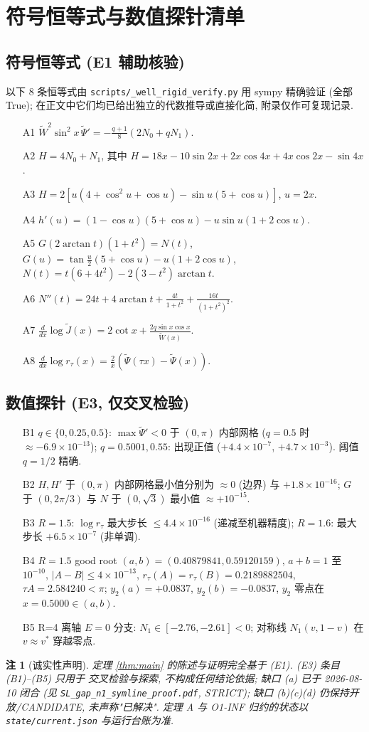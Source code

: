 \documentclass[UTF8]{ctexart}
\newtheorem{remark}[theorem]{注}
\begin{document}
\appendix
\section{符号恒等式与数值探针清单}\label{app:verify}

\subsection{符号恒等式 (E1 辅助核验)}
以下 8 条恒等式由 \texttt{scripts/\_well\_rigid\_verify.py} 用 sympy 精确验证
(全部 True); 在正文中它们均已给出独立的代数推导或直接化简, 附录仅作可复现记录.
\begin{enumerate}
	\item[A1] $\widetilde W^2\sin^2x\,\widetilde\Psi'=-\frac{q+1}{8}(2N_0+qN_1)$.
	\item[A2] $H=4N_0+N_1$, 其中 $H=18x-10\sin2x+2x\cos4x+4x\cos2x-\sin4x$.
	\item[A3] $H=2[u(4+\cos^2u+\cos u)-\sin u(5+\cos u)]$, $u=2x$.
	\item[A4] $h'(u)=(1-\cos u)(5+\cos u)-u\sin u(1+2\cos u)$.
	\item[A5] $G(2\arctan t)(1+t^2)=N(t)$, $G(u)=\tan\frac u2(5+\cos u)-u(1+2\cos u)$,
		$N(t)=t(6+4t^2)-2(3-t^2)\arctan t$.
	\item[A6] $N''(t)=24t+4\arctan t+\frac{4t}{1+t^2}+\frac{16t}{(1+t^2)^2}$.
	\item[A7] $\frac{d}{dx}\log\widetilde J(x)=2\cot x+\frac{2q\sin x\cos x}{\widetilde W(x)}$.
	\item[A8] $\frac{d}{dx}\log r_{\tau}(x)=\frac2x(\widetilde\Psi(\tau x)-\widetilde\Psi(x))$.
\end{enumerate}

\subsection{数值探针 (E3, 仅交叉检验)}
\begin{enumerate}
	\item[B1] $q\in\{0,0.25,0.5\}$: $\max\widetilde\Psi'<0$ 于 $(0,\pi)$ 内部网格
		($q=0.5$ 时 $\approx-6.9\times10^{-13}$); $q=0.5001,0.55$: 出现正值
		($+4.4\times10^{-7}$, $+4.7\times10^{-3}$). 阈值 $q=1/2$ 精确.
	\item[B2] $H,H'$ 于 $(0,\pi)$ 内部网格最小值分别为 $\approx0$ (边界) 与
		$+1.8\times10^{-16}$; $G$ 于 $(0,2\pi/3)$ 与 $N$ 于 $(0,\sqrt3)$
		最小值 $\approx+10^{-15}$.
	\item[B3] $R=1.5$: $\log r_{\tau}$ 最大步长 $\le4.4\times10^{-16}$
		(递减至机器精度); $R=1.6$: 最大步长 $+6.5\times10^{-7}$ (非单调).
	\item[B4] $R=1.5$ good root $(a,b)=(0.40879841,0.59120159)$,
		$a+b=1$ 至 $10^{-10}$, $|A-B|\le4\times10^{-13}$,
		$r_{\tau}(A)=r_{\tau}(B)=0.2189882504$, $\tau A=2.584240<\pi$;
		$y_2(a)=+0.0837$, $y_2(b)=-0.0837$, $y_2$ 零点在 $x=0.5000\in(a,b)$.
	\item[B5] R=4 离轴 $E=0$ 分支: $N_1\in[-2.76,-2.61]<0$; 对称线
		$N_1(v,1-v)$ 在 $v\approx v^*$ 穿越零点.
\end{enumerate}

\begin{remark}[诚实性声明]
	定理 \ref{thm:main} 的陈述与证明完全基于 (E1). (E3) 条目 (B1)--(B5) 只用于
	交叉检验与探索, 不构成任何结论依据; 缺口 (a) 已于 2026-08-10 闭合 (见 \texttt{SL\_gap\_n1\_symline\_proof.pdf}, STRICT); 缺口 (b)(c)(d) 仍保持开放/CANDIDATE,
	未声称"已解决". 定理 A 与 O1-INF 归约的状态以 \texttt{state/current.json}
	与运行台账为准.
\end{remark}
\end{document}
